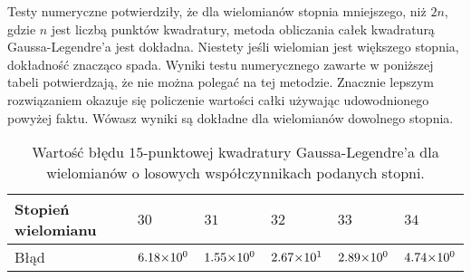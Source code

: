 \documentclass[a4paper,12pt]{article}
\newcommand{\razy}{\hspace{-0.5ex}\times\hspace{-0.5ex}} %
\begin{document}
Testy numeryczne potwierdziły, że dla wielomianów stopnia mniejszego, niż $2n$, gdzie $n$ jest liczbą punktów kwadratury, metoda obliczania całek kwadraturą Gaussa-Legendre'a jest dokładna.
Niestety jeśli wielomian jest większego stopnia, dokładność znacząco spada. Wyniki testu numerycznego zawarte w poniższej tabeli potwierdzają, że nie można polegać na tej metodzie. Znacznie lepszym rozwiązaniem okazuje się policzenie wartości całki używając udowodnionego powyżej faktu. Wówasz wyniki są dokładne dla wielomianów dowolnego stopnia.
\begin{table}[!h]\vspace*{-2ex}
\caption{\footnotesize Wartość błędu $15$-punktowej kwadratury Gaussa-Legendre'a dla wielomianów o losowych współczynnikach podanych stopni.
}\vspace{-1.5ex}
\begin{center}
\begin{tabular}{|l|l|l|l|l|l|}
\hline
Stopień wielomianu & $30$            & $31$            & $32$           & $33$            & $34$            \\ \hline
Błąd               & $6.18\razy10^0$ & $1.55\razy10^0$ & $2.67\razy10^1$ & $2.89\razy10^0$ & $4.74\razy10^0$ \\ \hline
\end{tabular}
\end{center}
\end{table}
\end{document}
